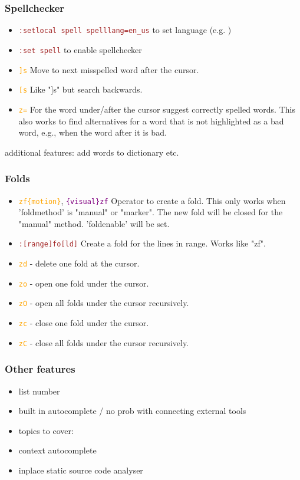\documentclass{beamer}
\newcommand{\vimnormal}[1]{\texttt{\textcolor{orange}{#1}}}
\newcommand{\vimcommand}[1]{\texttt{\textcolor{brown}{#1}}}
\newcommand{\vimvisual}[1]{\texttt{\textcolor{purple}{#1}}}
\begin{document}
\begin{frame}
    \frametitle{Spellchecker}
    \begin{itemize}
        \item \vimcommand{:setlocal spell spelllang=en\_us} to set language (e.g. )
        \item \vimcommand{:set spell} to enable spellchecker
        \item \vimnormal{]s} Move to next misspelled word after the cursor.
        \item \vimnormal{[s} Like "]s" but search backwards.
        \item \vimnormal{z=} For the word under/after the cursor suggest correctly spelled words. This also works to find alternatives for a word that is not highlighted as a bad word, e.g., when the word after it is bad.
    \end{itemize}
    additional features: add words to dictionary etc.
\end{frame}

\begin{frame}
    \frametitle{Folds}
    \begin{itemize}
        \item \vimnormal{zf\{motion\}}, \vimvisual{\{visual\}zf} Operator to create a fold.  This only works when 'foldmethod' is "manual" or "marker".  The new fold will be closed for the "manual" method.  'foldenable' will be set.
        \item \vimcommand{:[range]fo[ld]} Create a fold for the lines in {range}.  Works like "zf".
        \item \vimnormal{zd} - delete one fold at the cursor.
        \item \vimnormal{zo} - open one fold under the cursor.
        \item \vimnormal{zO} - open all folds under the cursor recursively.
        \item \vimnormal{zc} - close one fold under the cursor.
        \item \vimnormal{zC} - close all folds under the cursor recursively.
    \end{itemize}
\end{frame}

\begin{frame}
    \frametitle{Other features}
    \begin{itemize}
        \item list number
        \item built in autocomplete / no prob with connecting external tools
        \item topics to cover:
        \item context autocomplete
        \item inplace static source code analyser
    \end{itemize}
\end{frame}
\end{document}
